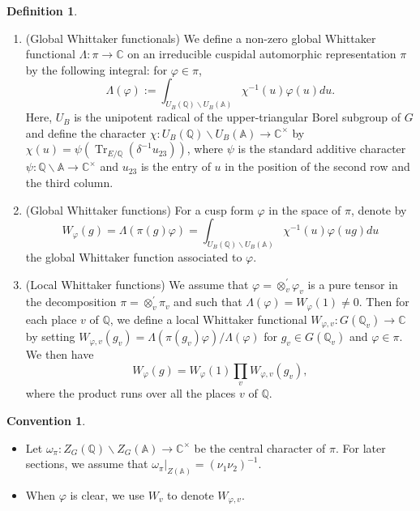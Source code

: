 \documentclass[11pt, a4paper]{amsart}
\theoremstyle{plain}
\theoremstyle{definition}
\newtheorem{definition}[theorem]{Definition}
\newtheorem{convention}[theorem]{Convention}
\numberwithin{equation}{section}
\def\AAA{\mathbb{A}}
\def\CC{\mathbb{C}}
\def\QQ{\mathbb{Q}}
\DeclareMathOperator{\Tr}{Tr}
\begin{document}
\begin{definition}
\label{def: Whittaker function}
    \begin{enumerate}
        \item (Global Whittaker functionals) We define a non-zero global Whittaker functional $\Lambda \colon \pi \rightarrow \CC$ on an irreducible cuspidal automorphic representation $\pi$ by the following integral: for $\varphi \in \pi$, 
        \begin{equation*}
            \Lambda(\varphi) := \int_{U_{B}(\QQ)\backslash U_B(\AAA)} \chi^{-1}(u) \varphi(u) du. 
        \end{equation*}
        Here, $U_{B}$ is the unipotent radical of the upper-triangular Borel subgroup of $G$ and define the character $\chi \colon U_{B}(\QQ) \backslash U_{B}(\AAA) \rightarrow \CC^{\times}$ by $\chi(u) = \psi(\Tr_{E/\QQ}(\delta^{-1}u_{23}))$, where $\psi$ is the standard additive character $\psi \colon \QQ\backslash \AAA \rightarrow \CC^{\times}$ and $u_{23}$ is the entry of $u$ in the position of the second row and the third column. 
        \item (Global Whittaker functions) For a cusp form $\varphi$ in the space of $\pi$, denote by
        \begin{equation*}
             W_{\varphi}(g) = \Lambda(\pi(g) \varphi) = \int_{U_{B}(\QQ)\backslash U_B(\AAA)} \chi^{-1}(u) \varphi(ug) du
        \end{equation*}
        the global Whittaker function associated to $\varphi$. 
        \item (Local Whittaker functions)
        We assume that $\varphi = \otimes_{v}^{\prime} \varphi_{v}$ is a pure tensor in the decomposition $\pi = \otimes_{v}^{\prime} \pi_{v}$ and such that $\Lambda(\varphi) = W_{\varphi}(1) \neq 0$. Then for each place $v$ of $\QQ$, we define a local Whittaker functional $W_{\varphi, v}\colon G(\QQ_{v}) \rightarrow \CC$ by setting $W_{\varphi, v}(g_{v}) = \Lambda(\pi(g_{v}) \varphi) / \Lambda(\varphi)$ for $g_v \in G(\QQ_v)$ and $\varphi \in \pi$. We then have 
        \begin{equation*}
            W_{\varphi}(g) = W_{\varphi}(1) \prod_{v} W_{\varphi, v}(g_v), 
        \end{equation*}
        where the product runs over all the places ${v}$ of $\QQ$. 
    \end{enumerate}
\end{definition}

\begin{convention}
    \begin{itemize}
        \item Let $\omega_{\pi}\colon Z_{G}(\QQ) \backslash Z_{G}(\AAA) \rightarrow \CC^{\times}$ be the central character of $\pi$. For later sections, we assume that $\omega_{\pi}|_{Z(\AAA)} = (\nu_1 \nu_2)^{-1}$. 
        \item When $\varphi$ is clear, we use $W_v$ to denote $W_{\varphi, v}$. 
    \end{itemize}
\end{convention}
\end{document}
